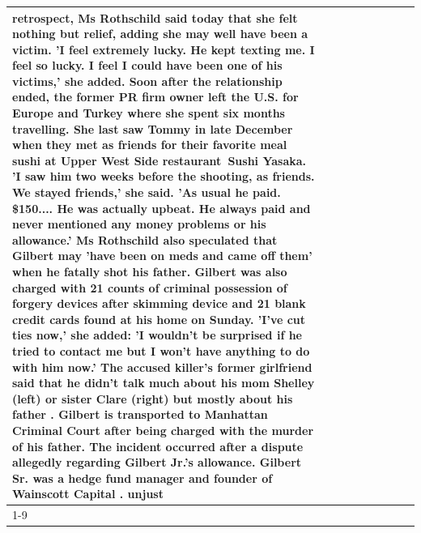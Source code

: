 \begin{table}[H]
\begin{tabular}{lllrlllll}
retrospect, Ms Rothschild said today that she felt nothing but relief, adding she may well have been a victim. 'I feel extremely lucky. He kept texting me. I feel so lucky. I feel I could have been one of his victims,' she added. Soon after the relationship ended, the former PR firm owner left the U.S. for Europe and Turkey where she spent six months  travelling. She last saw Tommy in late December when they met as friends for their favorite meal sushi at Upper West Side restaurant Sushi Yasaka. 'I saw him two weeks before the shooting, as friends. We stayed friends,' she said. 'As usual he paid. \$150.... He was actually upbeat. He always paid and never mentioned any money problems or his allowance.' Ms Rothschild also speculated that Gilbert may 'have been on meds and came off them' when he fatally shot his father. Gilbert was also charged with 21 counts of criminal possession of forgery devices after skimming device and 21 blank credit cards found at his home on Sunday. 'I've cut ties now,' she added: 'I wouldn’t be surprised if he tried to contact me but I won’t have anything to do with him now.' The accused killer's former girlfriend said that he didn't talk much about his mom Shelley (left) or sister Clare (right) but mostly about his father . Gilbert is transported to Manhattan Criminal Court  after being charged with the murder of his father. The incident occurred after a dispute allegedly regarding Gilbert Jr.'s allowance. Gilbert Sr. was a hedge fund manager and founder of Wainscott Capital . unjust \\
\cline{1-9} \cline{2-9}

\end{tabular}
\end{table}

